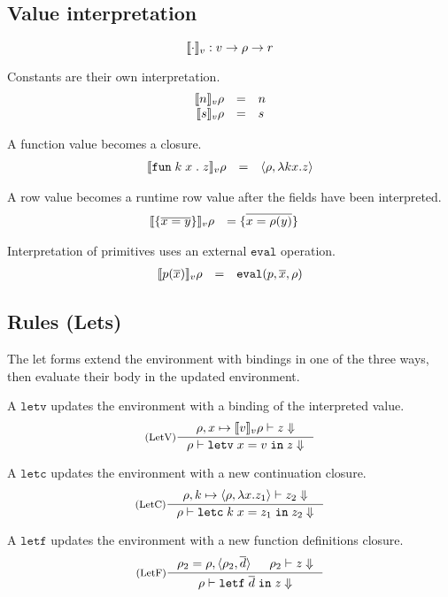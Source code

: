 \documentclass[11pt]{article}
\newcommand{\kw}[1]{\mathtt{#1}}
\begin{document}
\subsection*{Value interpretation}

\[
    \cmpn{v} : v -> \rho -> r
\]

Constants are their own interpretation.
\[
\begin{array}{rlll}
\cmp{v}{\intv{n}}{\rho} & = & n \\
\cmp{v}{\strv{s}}{\rho} & = & s \\
\end{array}
\]

A function value becomes a closure.
\[
\begin{array}{rlll}
\cmp{v}{\funv{k}{x}{z}}{\rho} & = & \clsf{\rho}{k}{x}{z} \\
\end{array}
\]

A row value becomes a runtime row value after the fields have been interpreted.
\[
\begin{array}{rlll}
\cmp{v}{\rowv{x}{y}}{\rho} & = \rowv{x}{\rho(y)} &
\end{array}
\]

Interpretation of primitives uses an external $\kw{eval}$ operation.
\[
\begin{array}{rlll}
\cmp{v}{\prmv{p}{\repo{x}}}{\rho} & = & \kw{eval}(p, \repo{x}, \rho)
\end{array}
\]

\subsection*{Rules (Lets)}

The let forms extend the environment with bindings in one of the three ways, then evaluate their body in the updated environment.

A $\kw{letv}$ updates the environment with a binding of the interpreted value.
\[
\inference[(LetV)]
{\interp{\extv{\rho}{x}{\cmp{v}{v}{\rho}}}{z}}
{\interp{\rho}{\letv{x}{v}{z}}}
\]

A $\kw{letc}$ updates the environment with a new continuation closure.
\[
\inference[(LetC)]
{\interp{\extc{\rho}{k}{\rho}{x}{z_1}}{z_2}}
{\interp{\rho}{\letc{k}{x}{z_1}{z_2}}}
\]

A $\kw{letf}$ updates the environment with a new function definitions closure.
\[
\inference[(LetF)]
{\rho_2 = \extff{\rho}{\rho_2}{d} & \interp{\rho_2}{z}}
{\interp{\rho}{\letf{d}{z}}}
\]
\end{document}
